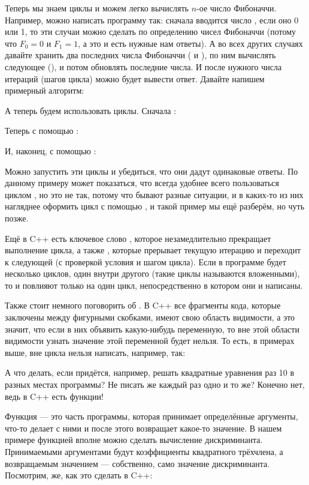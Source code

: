 Теперь мы знаем циклы и можем легко вычислять $n$-ое число Фибоначчи. Например, можно написать программу так: сначала вводится число , если оно 0 или 1, то эти случаи можно сделать по определению чисел Фибоначчи (потому что $F_0 = 0$ и $F_1 = 1$, а это и есть нужные нам ответы). А во всех других случаях давайте хранить два последних числа Фибоначчи ( и ), по ним вычислять следующее (), и потом обновлять последние числа. И после нужного числа итераций (шагов цикла) можно будет вывести ответ. Давайте напишем примерный алгоритм:


А теперь будем использовать циклы. Сначала :


Теперь с помощью :


И, наконец, с помощью :


Можно запустить эти циклы и убедиться, что они дадут одинаковые ответы. По данному примеру может показаться, что всегда удобнее всего пользоваться циклом , но это не так, потому что бывают разные ситуации, и в каких-то из них нагляднее оформить цикл с помощью , и такой пример мы ещё разберём, но чуть позже.

Ещё в C++ есть ключевое слово , которое незамедлительно прекращает выполнение цикла, а также , которые прерывает текущую итерацию и переходит к следующей (с проверкой условия и шагом цикла). Если в программе будет несколько циклов, один внутри другого (такие циклы называются вложенными), то  и  повлияют только на один цикл, непосредственно в котором они и написаны.

Также стоит немного поговорить об . В C++ все фрагменты кода, которые заключены между фигурными скобками, имеют свою область видимости, а это значит, что если в них объявить какую-нибудь переменную, то вне этой области видимости узнать значение этой переменной будет нельзя. То есть, в примерах выше, вне цикла нельзя написать, например, так:


А что делать, если придётся, например, решать квадратные уравнения раз 10 в разных местах программы? Не писать же каждый раз одно и то же? Конечно нет, ведь в C++ есть функции!

Функция — это часть программы, которая принимает определённые аргументы, что-то делает с ними и после этого возвращает какое-то значение.
В нашем примере функцией вполне можно сделать вычисление дискриминанта. Принимаемыми аргументами будут коэффициенты квадратного трёхчлена, а возвращаемым значением — собственно, само значение дискриминанта. Посмотрим, же, как это сделать в C++:

